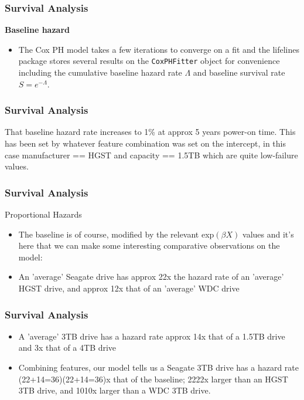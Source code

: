 \documentclass[]{beamer}
\begin{document}
	\begin{frame}
		\frametitle{Survival Analysis}
		\noindent \textbf{Baseline hazard}
		
		\begin{itemize}
			\item The Cox PH model takes a few iterations to converge on a fit and the lifelines package stores several results on the \texttt{CoxPHFitter} object for convenience including the cumulative baseline hazard rate $\Lambda$ and baseline survival rate $S=e^{-\Lambda}$.
		\end{itemize}
		
		
	\end{frame}
	\begin{frame}
		\frametitle{Survival Analysis}
		
		That baseline hazard rate increases to 1\% at approx 5 years power-on time. This has been set by whatever feature combination was set on the intercept, in this case manufacturer == HGST and capacity == 1.5TB which are quite low-failure values.
		
	\end{frame}
	\begin{frame}
		\frametitle{Survival Analysis}
		
		Proportional Hazards
		\begin{itemize}
			\item The baseline is of course, modified by the relevant exp$(\beta X)$ values and it's here that we can make some interesting comparative observations on the model:
			
			\item An 'average' Seagate drive has approx 22x the hazard rate of an 'average' HGST drive, and approx 12x that of an 'average' WDC drive
			
		\end{itemize}
		
	\end{frame}
	\begin{frame}
		\frametitle{Survival Analysis}
		\begin{itemize}
			\item A 'average' 3TB drive has a hazard rate approx 14x that of a 1.5TB drive and 3x that of a 4TB drive
			\item Combining features, our model tells us a Seagate 3TB drive has a hazard rate (22+14=36)(22+14=36)x that of the baseline; 2222x larger than an HGST 3TB drive, and 1010x larger than a WDC 3TB drive.
		\end{itemize}
	\end{frame}
\end{document}
